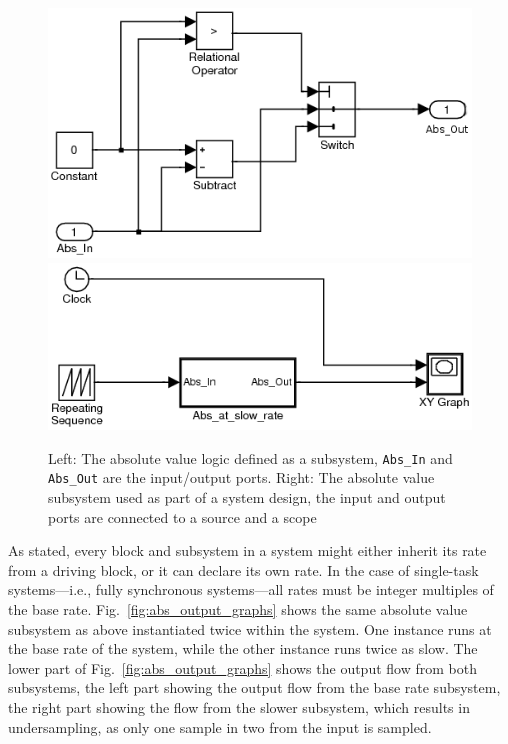 \begin{figure}
\centering
\includegraphics[scale=0.5]{figs/abs_block_simulink}
\hspace{10mm}
\includegraphics[scale=0.5]{figs/subsystem_simulink}
\caption{Left: The absolute value logic defined as a subsystem,
  \texttt{Abs\_In} and \texttt{Abs\_Out} are the input/output
  ports. Right: The absolute value subsystem used as part of a system
  design, the input and output ports are connected to a source and a
  scope}
\label{fig:subsystem_simulink}
\end{figure}

As stated, every block and subsystem in a system might either inherit
its rate from a driving block, or it can declare its own rate. In the
case of single-task systems---i.e., fully synchronous systems---all
rates must be integer multiples of the base
rate. Fig.~\ref{fig:abs_output_graphs} shows the same absolute value
subsystem as above instantiated twice within the system. One instance
runs at the base rate of the system, while the other instance runs
twice as slow. The lower part of Fig.~\ref{fig:abs_output_graphs}
shows the output flow from both subsystems, the left part showing the
output flow from the base rate subsystem, the right part showing the
flow from the slower subsystem, which results in undersampling, as
only one sample in two from the input is sampled.

